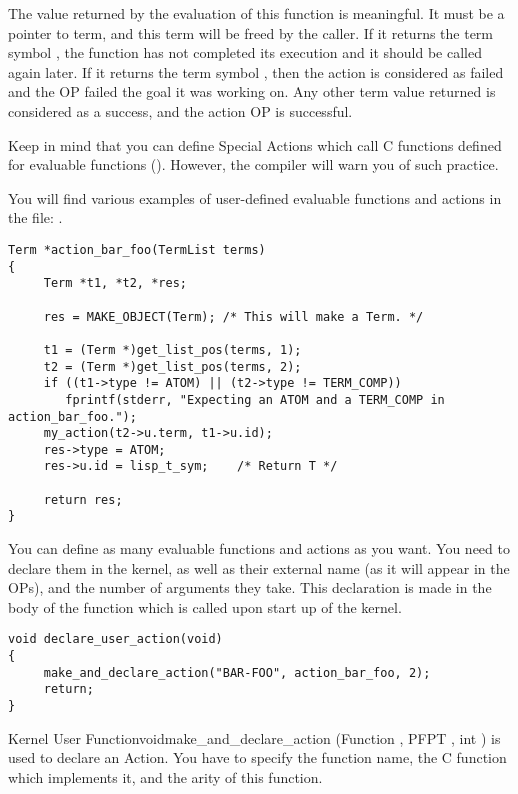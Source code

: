 The value returned by the evaluation of this function is meaningful. It must be
a pointer to term, and this term will be freed by the caller. If it returns the
term symbol , the function has not completed its execution and it
should be called again later. If it returns the term symbol , then
the action is considered as failed and the OP failed the goal it was working
on. Any other term value returned is considered as a success, and the action OP
is successful.

Keep in mind that you can define Special Actions which call C functions
defined for evaluable functions ().
However, the compiler will warn you of such practice.

You will find various examples of user-defined evaluable functions and
actions in the file: .

\begin{verbatim}
Term *action_bar_foo(TermList terms)
{
     Term *t1, *t2, *res;

     res = MAKE_OBJECT(Term); /* This will make a Term. */

     t1 = (Term *)get_list_pos(terms, 1);
     t2 = (Term *)get_list_pos(terms, 2);
     if ((t1->type != ATOM) || (t2->type != TERM_COMP))
        fprintf(stderr, "Expecting an ATOM and a TERM_COMP in action_bar_foo.");
     my_action(t2->u.term, t1->u.id);
     res->type = ATOM;
     res->u.id = lisp_t_sym;    /* Return T */

     return res;
}
\end{verbatim}

You can define as many evaluable functions and actions as you want.
You need to declare them in the kernel, as well as their
external name (as it will appear in the OPs), and the number of arguments
they take. This declaration is made in the body of the
 function which is called upon start up of
the kernel.

\begin{verbatim}
void declare_user_action(void)
{
     make_and_declare_action("BAR-FOO", action_bar_foo, 2);
     return;
}
\end{verbatim}

\begin{typefn}{Kernel User Function}{void}{make\_and\_declare\_action} 
        {(Function , PFPT , int )} 
is used to declare an Action.  You have to specify the function name, the C
function which implements it, and the arity of this function.
\end{typefn}

